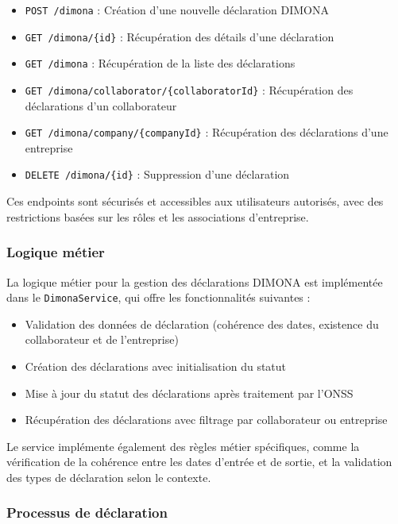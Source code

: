 \begin{itemize}
  \item \texttt{POST /dimona} : Création d'une nouvelle déclaration DIMONA
  \item \texttt{GET /dimona/\{id\}} : Récupération des détails d'une déclaration
  \item \texttt{GET /dimona} : Récupération de la liste des déclarations
  \item \texttt{GET /dimona/collaborator/\{collaboratorId\}} : Récupération des déclarations d'un collaborateur
  \item \texttt{GET /dimona/company/\{companyId\}} : Récupération des déclarations d'une entreprise
  \item \texttt{DELETE /dimona/\{id\}} : Suppression d'une déclaration
\end{itemize}

Ces endpoints sont sécurisés et accessibles aux utilisateurs autorisés, avec des restrictions basées sur les rôles et les associations d'entreprise.

\subsubsection{Logique métier}

La logique métier pour la gestion des déclarations DIMONA est implémentée dans le \texttt{DimonaService}, qui offre les fonctionnalités suivantes :

\begin{itemize}
  \item Validation des données de déclaration (cohérence des dates, existence du collaborateur et de l'entreprise)
  \item Création des déclarations avec initialisation du statut
  \item Mise à jour du statut des déclarations après traitement par l'ONSS
  \item Récupération des déclarations avec filtrage par collaborateur ou entreprise
\end{itemize}

Le service implémente également des règles métier spécifiques, comme la vérification de la cohérence entre les dates d'entrée et de sortie, et la validation des types de déclaration selon le contexte.

\subsubsection{Processus de déclaration}

